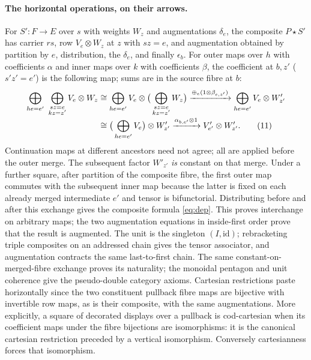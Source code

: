 \documentclass[11pt]{article}
\theoremstyle{definition}\newtheorem{definition}[theorem]{Definition}
\newcommand{\id}{\mathrm{id}}\newcommand{\op}{\mathrm{op}}\newcommand{\dom}{\mathrm{dom}}
\newcommand{\st}{\mathbin{\star}}\newcommand{\bx}{\mathop{\boxtimes}}
\begin{document}
\paragraph{The horizontal operations, on their arrows.}
For $S':F\to E$ over $s$ with weights $W_z$ and augmentations
$\delta_e$, the composite $P\st S'$ has carrier $rs$, row
$V_e\otimes W_z$ at $z$ with $sz=e$, and augmentation obtained by
partition by $e$, distribution, the $\delta_e$, and finally $\epsilon_b$.
For outer maps over $h$ with coefficients $\alpha$ and inner maps
over $k$ with coefficients $\beta$, the coefficient at $b,z'$
($s'z'=e'$) is the following map; sums are in the source fibre at $b$:
\begin{align}
 \bigoplus_{he=e'}\ \bigoplus_{\substack{sz=e\\kz=z'}}
                 V_e\otimes W_z
 &\cong\bigoplus_{he=e'} V_e\otimes
                      \big(\bigoplus_{\substack{sz=e\\kz=z'}}W_z\big)
 \xrightarrow{\oplus_e(1\otimes\beta_{e,z'})}
        \bigoplus_{he=e'} V_e\otimes W'_{z'} \notag\\[-2pt]
 &\cong\big(\bigoplus_{he=e'}V_e\big)\otimes W'_{z'}
 \xrightarrow{\alpha_{b,e'}\otimes1}V'_{e'}\otimes W'_{z'} .
 \tag{11}\label{eq:dep}
\end{align}
Continuation maps at different ancestors need not agree; all are
applied before the outer merge. The subsequent factor $W'_{z'}$
\emph{is} constant on that merge. Under a further square, after
partition of the composite fibre, the first outer map commutes
with the subsequent inner map because the latter is fixed on each
already merged intermediate $e'$ and tensor is bifunctorial.
Distributing before and after this exchange gives the composite
formula \eqref{eq:dep}. This proves interchange on arbitrary maps;
the two augmentation equations in inside-first order prove that the
result is augmented. The unit is the singleton $(I,\id)$;
rebracketing triple composites on an addressed chain gives the tensor
associator, and augmentation contracts the same last-to-first chain.
The same constant-on-merged-fibre exchange proves its naturality;
the monoidal pentagon and unit coherence give the pseudo-double
category axioms. Cartesian restrictions paste horizontally since the
two constituent pullback fibre maps are bijective with invertible row
maps, as is their composite, with the same augmentations. More
explicitly, a square of decorated displays over a pullback is
cod-cartesian when its coefficient maps under the fibre bijections
are isomorphisms: it is the canonical cartesian restriction preceded
by a vertical isomorphism. Conversely cartesianness forces that
isomorphism.
\end{document}

